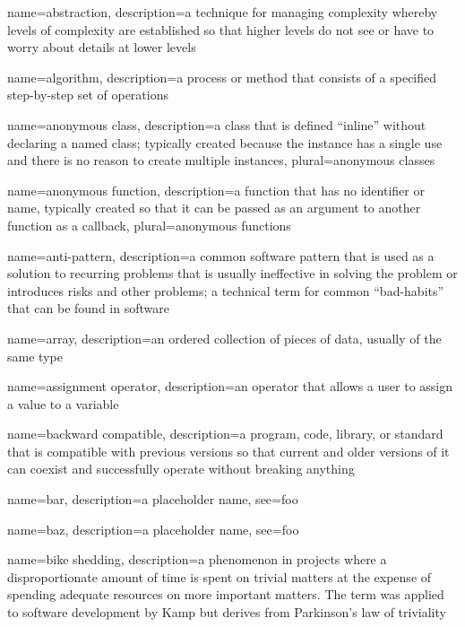 
{
  name=abstraction,
  description={a technique for managing complexity whereby levels of complexity are established so that higher levels do not see or have to worry about details at lower levels}
}

{
  name=algorithm,
  description={a process or method that consists of a specified step-by-step set of operations}
}

{
  name=anonymous class,
  description={a class that is defined ``inline'' without declaring a named class; typically created because the instance has a single use and there is no reason to create multiple instances},
  plural=anonymous classes
}

{
  name=anonymous function,
  description={a function that has no identifier or name, typically created so that it can be passed as an argument to another function as a callback},
  plural=anonymous functions
}

{
  name=anti-pattern,
  description={a common software pattern that is used as a solution to recurring problems that is usually ineffective in solving the problem or introduces risks and other problems; a technical term for common ``bad-habits'' that can be found in software}
}

{
  name=array,
  description={an ordered collection of pieces of data, usually of the same type}
}

{
  name=assignment operator,
  description={an operator that allows a user to assign a value to a variable}
}

{
  name=backward compatible,
  description={a program, code, library, or standard that is compatible with previous versions so that current
  	and older versions of it can coexist and successfully operate without breaking anything}
}

{
  name=bar,
  description={a placeholder name},
  see={foo}
}

{
  name=baz,
  description={a placeholder name},
  see={foo}
}

{
  name=bike shedding,
  description={a phenomenon in projects where a disproportionate amount of time is spent on trivial matters at the expense of spending adequate resources on more important matters.  The term was applied to software development by Kamp \cite{bikeShed99} but derives from Parkinson's law of triviality \cite{Parkinson58}}
}

